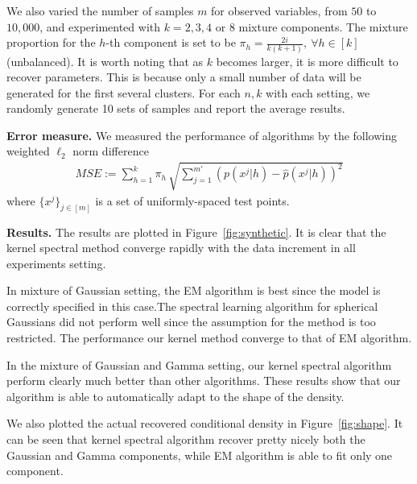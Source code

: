 \documentclass{article}
\begin{document}
We also varied the number of samples $m$ for observed variables, from $50$ to $10,000$, and
experimented with $k=2,3,4$ or $8$ mixture components. The mixture proportion for the $h$-th component is set to be $\pi_h= \frac{2i}{k(k+1)},~\forall h\in[k]$ (unbalanced). It is worth noting that as $k$ becomes larger, it is more difficult to recover parameters. This is because only a small number of data will be generated for the first several clusters. For each $n,k$ with each setting, we randomly generate 10 sets of samples and report the average results.

{\bf Error measure.} We measured the performance of algorithms by the
following weighted $\ell_2$ norm difference
\begin{align*}
  MSE:=\sum_{h=1}^{k} \pi_h\, \sqrt{\sum_{j=1}^{m'} (p(x^j|h) - \widehat{p}(x^j|h))^2 }
\end{align*}
where $\{x^j\}_{j\in[m]}$ is a set of uniformly-spaced test points. 

{\bf Results.} The results are plotted in Figure~\ref{fig:synthetic}. It is clear that the kernel spectral method converge rapidly with the data increment in all experiments setting.

In mixture of Gaussian setting, the EM algorithm is best since the model is correctly specified in this case.The spectral learning algorithm for spherical Gaussians did not perform well since the assumption for the method is too restricted. The performance our kernel method converge to that of EM algorithm.

In the mixture of Gaussian and Gamma setting, our kernel spectral algorithm perform clearly much better than other algorithms. These results show that our algorithm is able to automatically adapt to the shape of the density. 

We also plotted the actual recovered conditional density in Figure~\ref{fig:shape}. It can be seen that kernel spectral algorithm recover pretty nicely both the Gaussian and Gamma components, while EM algorithm is able to fit only one component. 
\end{document}
